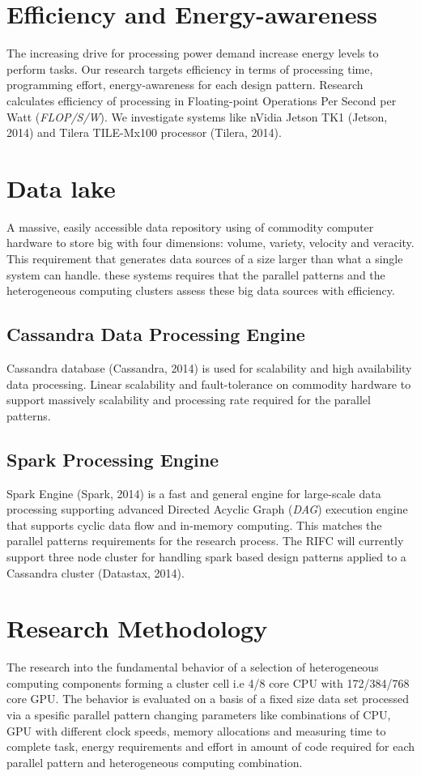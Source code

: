 \documentclass{acm_proc_article-sp}
\begin{document}
\section{Efficiency and Energy-awareness}
The increasing drive for processing power demand increase energy levels to perform tasks. Our research targets efficiency in terms of processing time, programming effort, energy-awareness for each design pattern. Research calculates efficiency of processing in Floating-point Operations Per Second per Watt (\textit{FLOP/S/W}). We investigate systems like nVidia Jetson TK1 (Jetson, 2014) and Tilera TILE-Mx100 processor (Tilera, 2014).
\section{Data lake}
A massive, easily accessible data repository using of commodity computer hardware to store big with four dimensions: volume, variety, velocity and veracity. This requirement that generates data sources of a size larger than what a single system can handle. these systems requires that the parallel patterns and the heterogeneous computing clusters assess these big data sources with efficiency. 
\subsection{Cassandra Data Processing Engine}
Cassandra database (Cassandra, 2014) is used for scalability and high availability data processing. Linear scalability and fault-tolerance on commodity hardware to support massively scalability and processing rate required for the parallel patterns.
\subsection{Spark Processing Engine}
Spark Engine (Spark, 2014) is a fast and general engine for large-scale data processing supporting advanced Directed Acyclic Graph (\textit{DAG}) execution engine that supports cyclic data flow and in-memory computing. This matches the parallel patterns requirements for the research process. The RIFC will currently support three node cluster for handling spark based design patterns applied to a Cassandra cluster (Datastax, 2014). 
\section{Research Methodology}
The research into the fundamental behavior of a selection of heterogeneous computing components forming a cluster cell i.e 4/8 core CPU with 172/384/768 core GPU. The behavior is evaluated on a basis of a fixed size data set processed via a spesific parallel pattern changing parameters like combinations of CPU, GPU with different clock speeds, memory allocations and measuring time to complete task, energy requirements and effort in amount of code required for each parallel pattern and heterogeneous computing combination. 
\end{document}
